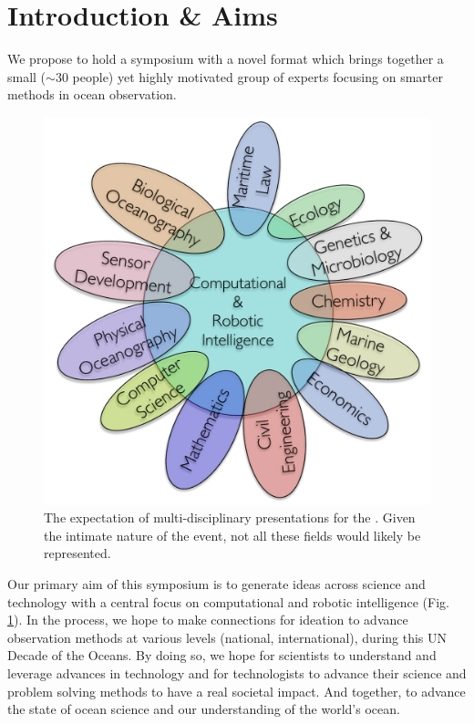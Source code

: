 \section{Introduction \& Aims}
\label{sec:intro}



\noindent
We propose to hold a symposium with a novel format which brings
together a small ($\sim 30$ people) yet highly motivated group of
experts focusing on smarter methods in ocean observation.%

\begin{figure}
  \vspace{-0.5cm}
  \centering 
  \includegraphics[scale=0.4]{fig/disciplines.pdf}
  \caption{The expectation of multi-disciplinary presentations for the
    \sympe. Given the intimate nature of the event, not all these
    fields would likely be represented.}
  \label{fig:concept}
  \vspace{-0.5cm}
\end{figure}

Our primary aim of this symposium is to generate ideas across science
and technology with a central focus on computational and robotic
intelligence (Fig. \ref{fig:concept}).  In the process, we hope to
make connections for ideation to advance observation methods at
various levels (national, international), during this \textsf{UN
  Decade of the Oceans}. By doing so, we hope for scientists to
understand and leverage advances in technology and for technologists
to advance their science and problem solving methods to have a real
societal impact. And together, to advance the state of ocean science
and our understanding of the world's ocean.


